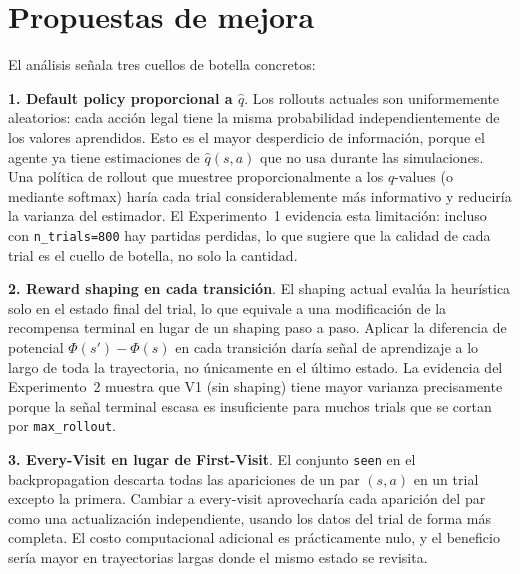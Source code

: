 \documentclass[11pt, a4paper]{article}
\begin{document}
\section*{Propuestas de mejora}

El análisis señala tres cuellos de botella concretos:

\textbf{1. Default policy proporcional a $\hat{q}$}. Los rollouts actuales son uniformemente aleatorios: cada acción legal tiene la misma probabilidad independientemente de los valores aprendidos. Esto es el mayor desperdicio de información, porque el agente ya tiene estimaciones de $\hat{q}(s,a)$ que no usa durante las simulaciones. Una política de rollout que muestree proporcionalmente a los $\hat{q}$-values (o mediante softmax) haría cada trial considerablemente más informativo y reduciría la varianza del estimador. El Experimento~1 evidencia esta limitación: incluso con \texttt{n\_trials=800} hay partidas perdidas, lo que sugiere que la calidad de cada trial es el cuello de botella, no solo la cantidad.

\textbf{2. Reward shaping en cada transición}. El shaping actual evalúa la heurística solo en el estado final del trial, lo que equivale a una modificación de la recompensa terminal en lugar de un shaping paso a paso. Aplicar la diferencia de potencial $\Phi(s') - \Phi(s)$ en cada transición daría señal de aprendizaje a lo largo de toda la trayectoria, no únicamente en el último estado. La evidencia del Experimento~2 muestra que V1 (sin shaping) tiene mayor varianza precisamente porque la señal terminal escasa es insuficiente para muchos trials que se cortan por \texttt{max\_rollout}.

\textbf{3. Every-Visit en lugar de First-Visit}. El conjunto \texttt{seen} en el backpropagation descarta todas las apariciones de un par $(s,a)$ en un trial excepto la primera. Cambiar a every-visit aprovecharía cada aparición del par como una actualización independiente, usando los datos del trial de forma más completa. El costo computacional adicional es prácticamente nulo, y el beneficio sería mayor en trayectorias largas donde el mismo estado se revisita.
\end{document}
